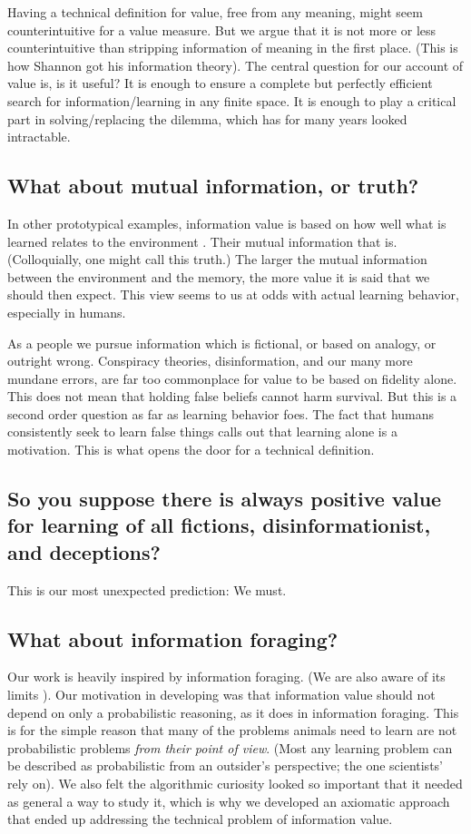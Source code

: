 Having a technical definition for value, free from any meaning, might seem counterintuitive for a value measure. But we argue that it is not more or less counterintuitive than stripping information of meaning in the first  place. (This is how Shannon got his information theory). The central question for our account of value is, is it useful? It is enough to ensure a complete but perfectly efficient search for information/learning in any finite space. It is enough to play a critical part in solving/replacing the dilemma, which has for many years looked intractable. 


\subsection*{What about mutual information, or truth?}
In other prototypical examples, information value is based on how well what is learned relates to the environment \cite{needed}. Their mutual information that is. (Colloquially, one might call this truth.) The larger the mutual information between the environment and the memory, the more value it is said that we should then expect. This view seems to us at odds with actual learning behavior, especially in humans. 

As a people we pursue information which is fictional, or based on analogy, or outright wrong. Conspiracy theories, disinformation, and our many more mundane errors, are far too commonplace for value to be based on fidelity alone. This does not mean that holding false beliefs cannot harm survival. But this is a second order question as far as learning behavior foes. The fact that humans consistently seek to learn false things calls out that learning alone is a motivation. This is what opens the door for a technical definition.


\subsection*{So you suppose there is always positive value for learning of all fictions, disinformationist, and deceptions?}
This is our most unexpected prediction: We must.


\subsection*{What about information foraging?}
Our work is heavily inspired by information foraging. (We are also aware of its limits \cite{needed}). Our motivation in developing was that information value should not depend on only a probabilistic reasoning, as it does in information foraging. This is for the simple reason that many of the problems animals need to learn are not probabilistic problems \textit{from their point of view}. (Most any learning problem can be described as probabilistic from an outsider's perspective; the one scientists' rely on). We also felt the algorithmic curiosity looked so important that it needed as general a way to study it, which is why we developed an axiomatic approach that ended up addressing the technical problem of information value.


